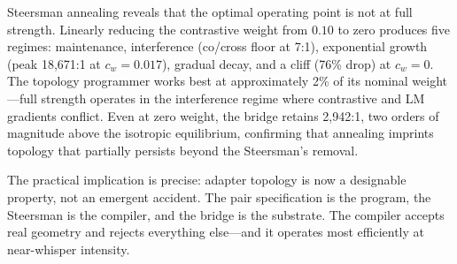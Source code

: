 Steersman annealing reveals that the optimal operating point is not at
full strength. Linearly reducing the contrastive weight from $0.10$ to
zero produces five regimes: maintenance, interference (co/cross floor
at 7:1), exponential growth (peak 18{,}671:1 at $c_w = 0.017$), gradual
decay, and a cliff (76\% drop) at $c_w = 0$. The topology programmer
works best at approximately 2\% of its nominal weight---full strength
operates in the interference regime where contrastive and LM gradients
conflict. Even at zero weight, the bridge retains 2{,}942:1,
two orders of magnitude above the isotropic equilibrium, confirming
that annealing imprints topology that partially persists beyond the
Steersman's removal.

The practical implication is precise: adapter topology is now a
designable property, not an emergent accident. The pair specification is
the program, the Steersman is the compiler, and the bridge is the
substrate. The compiler accepts real geometry and rejects everything
else---and it operates most efficiently at near-whisper intensity.
